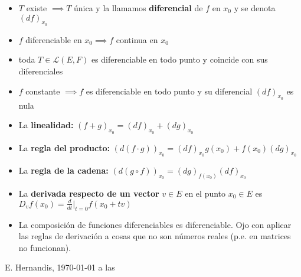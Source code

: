 \documentclass[a4paper,twocolumn]{extarticle}
\newcommand{\lacot}[1]{\mathcal{L}(#1)}
\begin{document}
\begin{itemize}
	\item $T$ existe $\implies T$ única y la llamamos \textbf{diferencial} de $f$ en $x_0$ y se denota $(df)_{x_0}$
	\item $f$ diferenciable en $x_0 \implies f$ continua en $x_0$
	\item toda $T \in \lacot{E,F}$ es diferenciable en todo punto y coincide con sus diferenciales
	\item $f$ constante $\implies f$ es diferenciable en todo punto y su diferencial $(df)_{x_0}$ es nula
	\item La \textbf{linealidad:} $(f + g)_{x_0} = (df)_{x_0} + (dg)_{x_0}$
	\item La \textbf{regla del producto:} $(d(f\cdot g))_{x_0} = (df)_{x_0}g(x_0) + f(x_0)(dg)_{x_0}$
	\item La \textbf{regla de la cadena:} $(d(g \circ f))_{x_0} = (dg)_{f(x_0)} (df)_{x_0}$
	\item La \textbf{derivada respecto de un vector} $v \in E$ en el punto $x_0 \in E$ es $D_vf(x_0) = \frac{d}{dt}\vert_{t=0}f(x_0 + tv)$
	\item La composición de funciones diferenciables es diferenciable. Ojo con aplicar las reglas de derivación a cosas que no son números reales (p.e. en matrices no funcionan).
\end{itemize}


\begin{flushright}
	E. Hernandis, \today $ $ a las \currenttime
\end{flushright}
\end{document}
